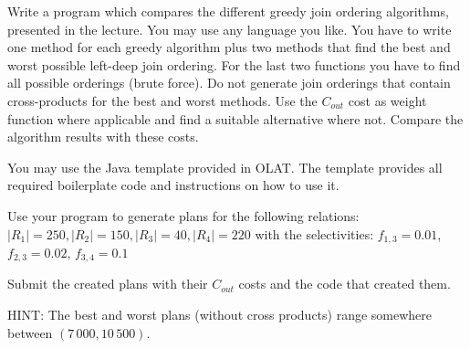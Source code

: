 
Write a program which compares the different greedy join ordering algorithms, presented in the lecture.
You may use any language you like.
You have to write one method for each greedy algorithm plus two methods that find the best and worst possible left-deep join ordering.
For the last two functions you have to find all possible orderings (brute force).
Do not generate join orderings that contain cross-products for the best and worst methods.
Use the $C_{out}$ cost as weight function where applicable and find a suitable alternative where not.
Compare the algorithm results with these costs.

You may use the Java template provided in OLAT.
The template provides all required boilerplate code and instructions on how to use it.

Use your program to generate plans for the following relations: 
$|R_1| = 250, |R_2| = 150, |R_3| = 40, |R_4| = 220$ with the selectivities: $f_{1,3} = 0.01$, $f_{2,3} = 0.02$, $f_{3,4} = 0.1$

Submit the created plans with their $C_{out}$ costs and the code that created them.

HINT: The best and worst plans (without cross products) range somewhere between $(7\,000,10\,500)$.


